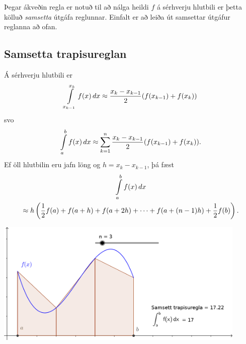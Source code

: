 \documentclass[letterpaper,10pt,icelandic]{sphinxmanual}
\begin{document}
Þegar ákveðin regla er notuð til að nálga heildi \(f\) á sérhverju
hlutbili er þetta kölluð \emph{samsetta} útgáfa reglunnar. Einfalt er að
leiða út samsettar útgáfur reglanna að ofan.


\subsection{Samsetta trapisureglan}
\label{kafli05:index-6}\label{kafli05:samsetta-trapisureglan}
Á sérhverju hlutbili er
\begin{gather}
\begin{split}\int\limits_{x_{k-1}}^{x_k} f(x) \, dx
  \approx
  \frac{x_k-x_{k-1}}{2}(f(x_{k-1}) + f(x_k))\end{split}\notag
\end{gather}
svo
\begin{gather}
\begin{split}\int\limits_a^b f(x) \, dx
  \approx
  \sum\limits_{k=1}^n \frac{x_k-x_{k-1}}{2}(f(x_{k-1}) + f(x_k)).\end{split}\notag
\end{gather}
Ef öll hlutbilin eru jafn löng og \(h = x_k-x_{k-1}\), þá fæst
\begin{gather}
\begin{split}\begin{gathered}
  \int\limits_a^b f(x) \, dx \\
  \approx
  h\left( \frac{1}{2}f(a) + f(a+h) + f(a+2h)
    + \cdots + f(a+(n-1)h) + \frac{1}{2}f(b) \right).\end{gathered}\end{split}\notag
\end{gather}

\begin{center}
\includegraphics[width=12cm,keepaspectratio=true]{./samsett_trapisuregla.png}
\end{center}
\end{document}
